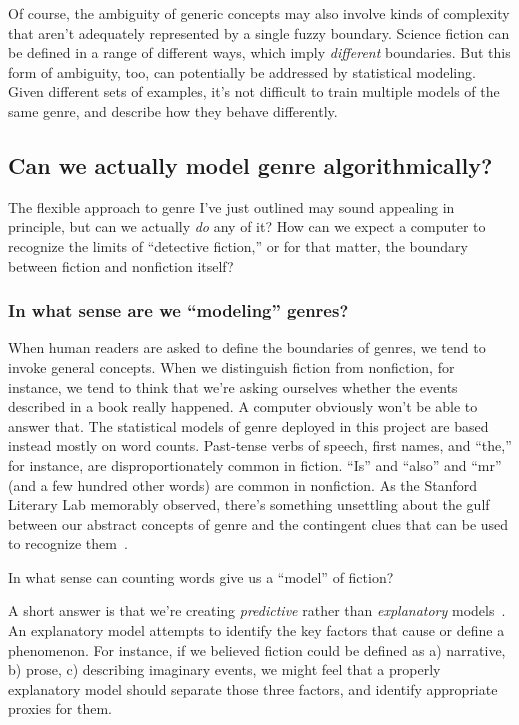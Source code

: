 \documentclass[paper=a4, fontsize=12pt]{scrartcl}
\numberwithin{equation}{section}		%
\numberwithin{figure}{section}			%
\numberwithin{table}{section}				%
\begin{document}
Of course, the ambiguity of generic concepts may also involve kinds of complexity that aren't adequately represented by a single fuzzy boundary. Science fiction can be defined in a range of different ways, which imply \textit{different} boundaries. But this form of ambiguity, too, can potentially be addressed by statistical modeling. Given different sets of examples, it's not difficult to train multiple models of the same genre, and describe how they behave differently.

\subsection{Can we actually model genre algorithmically?}

The flexible approach to genre I've just outlined may sound appealing in principle, but can we actually \textit{do} any of it? How can we expect a computer to recognize the limits of ``detective fiction,'' or for that matter, the boundary between fiction and nonfiction itself?

\subsubsection{In what sense are we ``modeling'' genres?}

When human readers are asked to define the boundaries of genres, we tend to invoke general concepts. When we distinguish fiction from nonfiction, for instance, we tend to think that we're asking ourselves whether the events described in a book really happened. A computer obviously won't be able to answer that. The statistical models of genre deployed in this project are based instead mostly on word counts. Past-tense verbs of speech, first names, and ``the,'' for instance, are disproportionately common in fiction. ``Is'' and ``also'' and ``mr'' (and a few hundred other words) are common in nonfiction. As the Stanford Literary Lab memorably observed, there's something unsettling about the gulf between our abstract concepts of genre and the contingent clues that can be used to recognize them~\cite{litlab:quantitative-formalism}.

In what sense can counting words give us a ``model'' of fiction?

A short answer is that we're creating \textit{predictive} rather than \textit{explanatory} models~\cite{shmueli:explain}. An explanatory model attempts to identify the key factors that cause or define a phenomenon. For instance, if we believed fiction could be defined as a) narrative, b) prose, c) describing imaginary events, we might feel that a properly explanatory model should separate those three factors, and identify appropriate proxies for them.
\end{document}
